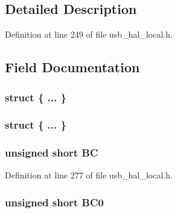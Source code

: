 \subsection{Detailed Description}


Definition at line 249 of file usb\+\_\+hal\+\_\+local.\+h.



\subsection{Field Documentation}
\hypertarget{union___b_y_t_e_c_o_u_n_t_a9eca3c3cc6699e1b20614c5f106fc251}{}\subsubsection[{"@530}]{\setlength{\rightskip}{0pt plus 5cm}struct \{ ... \} }\label{union___b_y_t_e_c_o_u_n_t_a9eca3c3cc6699e1b20614c5f106fc251}
\hypertarget{union___b_y_t_e_c_o_u_n_t_a2f4992ed9d726359109ea27f066c8924}{}\subsubsection[{"@532}]{\setlength{\rightskip}{0pt plus 5cm}struct \{ ... \} }\label{union___b_y_t_e_c_o_u_n_t_a2f4992ed9d726359109ea27f066c8924}
\hypertarget{union___b_y_t_e_c_o_u_n_t_a4d0dba525767a6f06c706153021d9890}{}
\subsubsection[{B\+C}]{\setlength{\rightskip}{0pt plus 5cm}unsigned short B\+C}\label{union___b_y_t_e_c_o_u_n_t_a4d0dba525767a6f06c706153021d9890}


Definition at line 277 of file usb\+\_\+hal\+\_\+local.\+h.

\hypertarget{union___b_y_t_e_c_o_u_n_t_a01f9bedad3eca024129aa48ba7bfea87}{}
\subsubsection[{B\+C0}]{\setlength{\rightskip}{0pt plus 5cm}unsigned short B\+C0}\label{union___b_y_t_e_c_o_u_n_t_a01f9bedad3eca024129aa48ba7bfea87}


